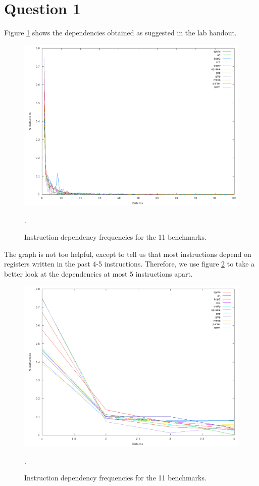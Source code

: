 \section{Question 1}
Figure \ref{q1:frequencies} shows the dependencies obtained as suggested in the
lab handout.

\begin{figure}[htb]
  \includegraphics[width=6.8in]{6.823/lab1/figs/frequencies.png}
  \caption{Instruction dependency frequencies for the 11 benchmarks. }
  \label{q1:frequencies}.
\end{figure}

The graph is not too helpful, except to tell us that most instructions depend
on registers written in the past 4-5 instructions. Therefore, we use figure
\ref{q1:frequencies_zoom} to take a better look at the dependencies at most 5
instructions apart.

\begin{figure}[htb]
  \includegraphics[width=6.8in]{6.823/lab1/figs/frequencies_zoom.png}
  \caption{Instruction dependency frequencies for the 11 benchmarks. }
  \label{q1:frequencies_zoom}.
\end{figure}

